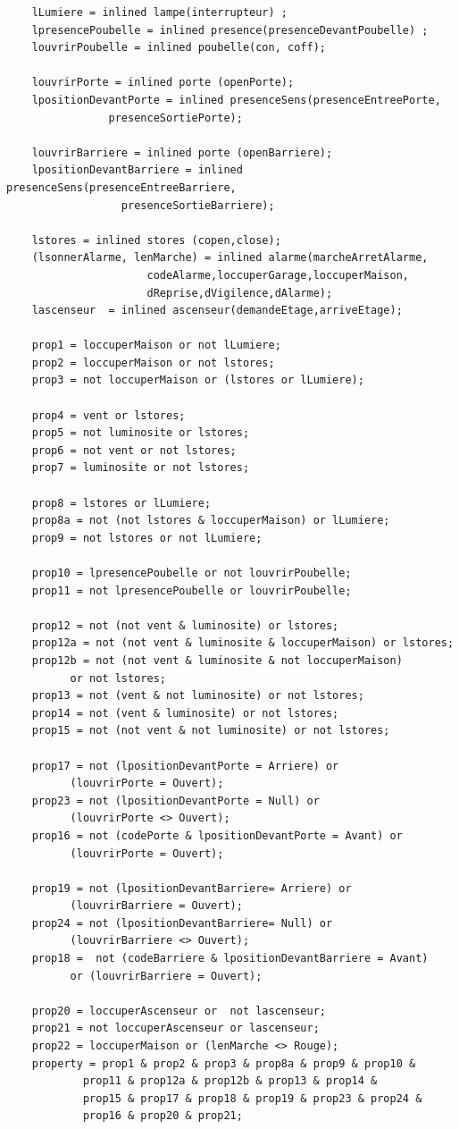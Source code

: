 \documentclass{svjour3}
\begin{document}
\begin{lstlisting}
	lLumiere = inlined lampe(interrupteur) ;
	lpresencePoubelle = inlined presence(presenceDevantPoubelle) ;
	louvrirPoubelle = inlined poubelle(con, coff);

	louvrirPorte = inlined porte (openPorte);
	lpositionDevantPorte = inlined presenceSens(presenceEntreePorte,
				presenceSortiePorte);

	louvrirBarriere = inlined porte (openBarriere);
	lpositionDevantBarriere = inlined presenceSens(presenceEntreeBarriere,
				  presenceSortieBarriere);

	lstores = inlined stores (copen,close);
	(lsonnerAlarme, lenMarche) = inlined alarme(marcheArretAlarme,
				      codeAlarme,loccuperGarage,loccuperMaison,
				      dReprise,dVigilence,dAlarme);
	lascenseur  = inlined ascenseur(demandeEtage,arriveEtage);
	
	prop1 = loccuperMaison or not lLumiere;
	prop2 = loccuperMaison or not lstores;
	prop3 = not loccuperMaison or (lstores or lLumiere);
	
	prop4 = vent or lstores;
	prop5 = not luminosite or lstores;
	prop6 = not vent or not lstores;	
	prop7 = luminosite or not lstores;
	
	prop8 = lstores or lLumiere;
	prop8a = not (not lstores & loccuperMaison) or lLumiere;
	prop9 = not lstores or not lLumiere;

	prop10 = lpresencePoubelle or not louvrirPoubelle;
	prop11 = not lpresencePoubelle or louvrirPoubelle;
	
	prop12 = not (not vent & luminosite) or lstores;
	prop12a = not (not vent & luminosite & loccuperMaison) or lstores;
	prop12b = not (not vent & luminosite & not loccuperMaison) 
		  or not lstores;
	prop13 = not (vent & not luminosite) or not lstores;
	prop14 = not (vent & luminosite) or not lstores;	
	prop15 = not (not vent & not luminosite) or not lstores;

	prop17 = not (lpositionDevantPorte = Arriere) or 
		  (louvrirPorte = Ouvert);
	prop23 = not (lpositionDevantPorte = Null) or 
		  (louvrirPorte <> Ouvert);
	prop16 = not (codePorte & lpositionDevantPorte = Avant) or 
		  (louvrirPorte = Ouvert);	

	prop19 = not (lpositionDevantBarriere= Arriere) or
		  (louvrirBarriere = Ouvert);
	prop24 = not (lpositionDevantBarriere= Null) or 
		  (louvrirBarriere <> Ouvert);
	prop18 =  not (codeBarriere & lpositionDevantBarriere = Avant) 
		  or (louvrirBarriere = Ouvert);
	
	prop20 = loccuperAscenseur or  not lascenseur;
	prop21 = not loccuperAscenseur or lascenseur;
	prop22 = loccuperMaison or (lenMarche <> Rouge);
	property = prop1 & prop2 & prop3 & prop8a & prop9 & prop10 &
		    prop11 & prop12a & prop12b & prop13 & prop14 & 
		    prop15 & prop17 & prop18 & prop19 & prop23 & prop24 & 
		    prop16 & prop20 & prop21;


\end{lstlisting}
\end{document}
